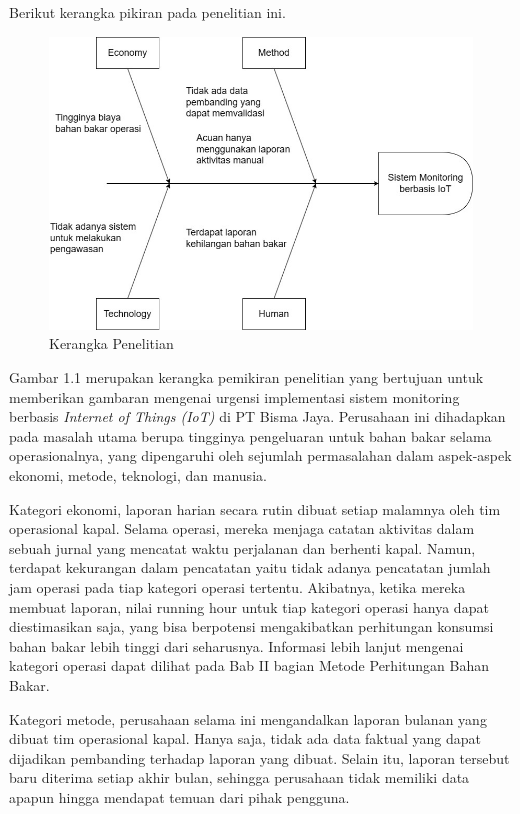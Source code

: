 Berikut kerangka pikiran pada penelitian ini.

\begin{figure}[ht]
    \includegraphics[width=1\linewidth, center]{images/pendahuluan/fig-framework-penelitian.jpg}
    \caption{Kerangka Penelitian}
    \label{fig:thinking-framework}
\end{figure}

\newpage

Gambar 1.1  merupakan kerangka pemikiran penelitian yang bertujuan untuk memberikan gambaran mengenai urgensi implementasi sistem monitoring berbasis \textit{Internet of Things (IoT)} di PT Bisma Jaya. Perusahaan ini dihadapkan pada masalah utama berupa tingginya pengeluaran untuk bahan bakar selama operasionalnya, yang dipengaruhi oleh sejumlah permasalahan dalam aspek-aspek ekonomi, metode, teknologi, dan manusia.

Kategori ekonomi, laporan harian secara rutin dibuat setiap malamnya oleh tim operasional kapal. Selama operasi, mereka menjaga catatan aktivitas dalam sebuah jurnal yang mencatat waktu perjalanan dan berhenti kapal. Namun, terdapat kekurangan dalam pencatatan yaitu tidak adanya pencatatan jumlah jam operasi pada tiap kategori operasi tertentu. Akibatnya, ketika mereka membuat laporan, nilai running hour untuk tiap kategori operasi hanya dapat diestimasikan saja, yang bisa berpotensi mengakibatkan perhitungan konsumsi bahan bakar lebih tinggi dari seharusnya. Informasi lebih lanjut mengenai kategori operasi dapat dilihat pada Bab II bagian Metode Perhitungan Bahan Bakar.

Kategori metode, perusahaan selama ini mengandalkan laporan bulanan yang dibuat tim operasional kapal. Hanya saja, tidak ada data faktual yang dapat dijadikan pembanding terhadap laporan yang dibuat. Selain itu, laporan tersebut baru diterima setiap akhir bulan, sehingga perusahaan tidak memiliki data apapun hingga mendapat temuan dari pihak pengguna.

